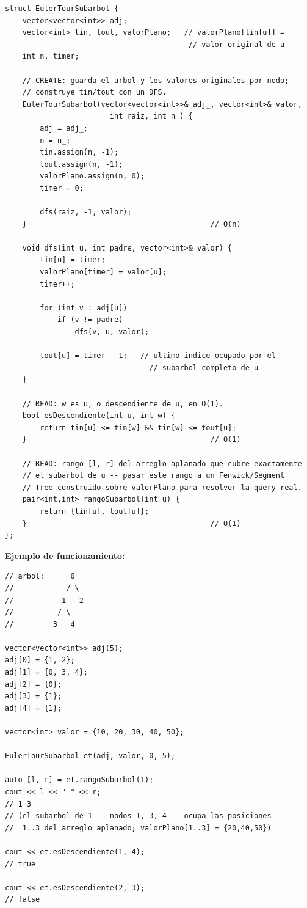 \documentclass[10pt,a4paper,twocolumn]{article}
\begin{document}
\begin{lstlisting}[style=cpp]
struct EulerTourSubarbol {
    vector<vector<int>> adj;
    vector<int> tin, tout, valorPlano;   // valorPlano[tin[u]] =
                                          // valor original de u
    int n, timer;

    // CREATE: guarda el arbol y los valores originales por nodo;
    // construye tin/tout con un DFS.
    EulerTourSubarbol(vector<vector<int>>& adj_, vector<int>& valor,
                        int raiz, int n_) {
        adj = adj_;
        n = n_;
        tin.assign(n, -1);
        tout.assign(n, -1);
        valorPlano.assign(n, 0);
        timer = 0;

        dfs(raiz, -1, valor);
    }                                          // O(n)

    void dfs(int u, int padre, vector<int>& valor) {
        tin[u] = timer;
        valorPlano[timer] = valor[u];
        timer++;

        for (int v : adj[u])
            if (v != padre)
                dfs(v, u, valor);

        tout[u] = timer - 1;   // ultimo indice ocupado por el
                                 // subarbol completo de u
    }

    // READ: w es u, o descendiente de u, en O(1).
    bool esDescendiente(int u, int w) {
        return tin[u] <= tin[w] && tin[w] <= tout[u];
    }                                          // O(1)

    // READ: rango [l, r] del arreglo aplanado que cubre exactamente
    // el subarbol de u -- pasar este rango a un Fenwick/Segment
    // Tree construido sobre valorPlano para resolver la query real.
    pair<int,int> rangoSubarbol(int u) {
        return {tin[u], tout[u]};
    }                                          // O(1)
};
\end{lstlisting}

\textbf{Ejemplo de funcionamiento:}

\begin{lstlisting}[style=cpp]
// arbol:      0
//            / \
//           1   2
//          / \
//         3   4

vector<vector<int>> adj(5);
adj[0] = {1, 2};
adj[1] = {0, 3, 4};
adj[2] = {0};
adj[3] = {1};
adj[4] = {1};

vector<int> valor = {10, 20, 30, 40, 50};

EulerTourSubarbol et(adj, valor, 0, 5);

auto [l, r] = et.rangoSubarbol(1);
cout << l << " " << r;
// 1 3
// (el subarbol de 1 -- nodos 1, 3, 4 -- ocupa las posiciones
//  1..3 del arreglo aplanado; valorPlano[1..3] = {20,40,50})

cout << et.esDescendiente(1, 4);
// true

cout << et.esDescendiente(2, 3);
// false
\end{lstlisting}
\end{document}
